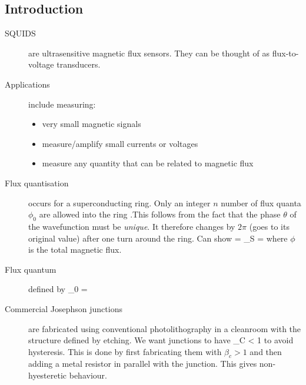 \subsection{Introduction}
\begin{description}
\item[SQUIDS] are ultrasensitive magnetic flux sensors. They can be thought of as flux-to-voltage transducers. 

\item[Applications] include measuring:

\begin{itemize}
\item very small magnetic signals
\item measure/amplify small currents or voltages
\item measure any quantity that can be related to magnetic flux
\end{itemize}

\item[Flux quantisation] occurs for a superconducting ring. Only an integer $n$ number of flux quanta $\phi_0$ are allowed into the ring .This follows from the fact that the phase $\theta$ of the wavefunction must be \emph{unique}. It therefore changes by $2\pi$ (goes to its original value) after one turn around the ring. Can show
\beq
\Delta \theta =  \int_S  \cdot \intd {} =  \phi
\eeq
where $\phi$ is the total magnetic flux. 

\item[Flux quantum] defined by 
\beq
\phi_0 = 
\eeq

\item[Commercial Josephson junctions ] are fabricated using conventional photolithography in a cleanroom with the structure defined by etching. We want junctions to have
\beq
\beta_C < 1
\eeq
to avoid hysteresis. This is done by first fabricating them with $\beta_c >1 $ and then adding a metal resistor in parallel with the junction. This gives non-hyesteretic behaviour. 

\end{description}
